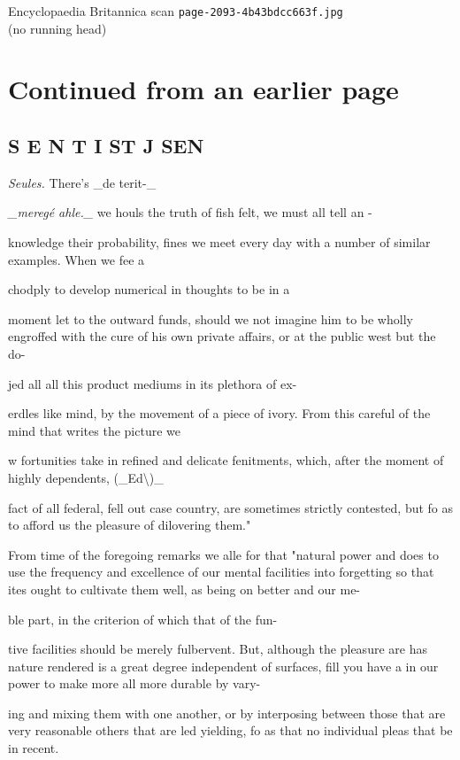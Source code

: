 \documentclass{article}
\begin{document}
\begin{center}
{\Large Encyclopaedia Britannica scan \texttt{page-2093-4b43bdcc663f.jpg}}\\[0.5em]
(no running head)
\end{center}
\section*{Continued from an earlier page}
\subsection*{S E N T I ST J SEN}
\textit{Seules.}
There’s \_de terit-\_

\textit{\_meregé ahle.\_}
we houls the truth of fish felt, we must all tell an -

knowledge their probability, fines we meet every day with a number of similar examples. When we fee a

chodply to develop numerical in thoughts to be in a

moment let to the outward funds, should we not imagine him to be wholly engroffed with the cure of his own private affairs, or at the public west but the do-

jed all all this product mediums in its plethora of ex-

erdles like mind, by the movement of a piece of ivory. From this careful of the mind that writes the picture we

w fortunities take in refined and delicate fenitments, which, after the moment of highly dependents, (\_Ed\textbackslash{})\_

fact of all federal, fell out case country, are sometimes strictly contested, but fo as to afford us the pleasure of dilovering them."

From time of the foregoing remarks we alle for that "natural power and does to use the frequency and excellence of our mental facilities into forgetting so that ites ought to cultivate them well, as being on better and our me-

ble part, in the criterion of which that of the fun-

tive facilities should be merely fulbervent. But, although the pleasure are has nature rendered is a great degree independent of surfaces, fill you have a in our power to make more all more durable by vary-

ing and mixing them with one another, or by interposing between those that are very reasonable others that are led yielding, fo as that no individual pleas that be in recent.
\end{document}
